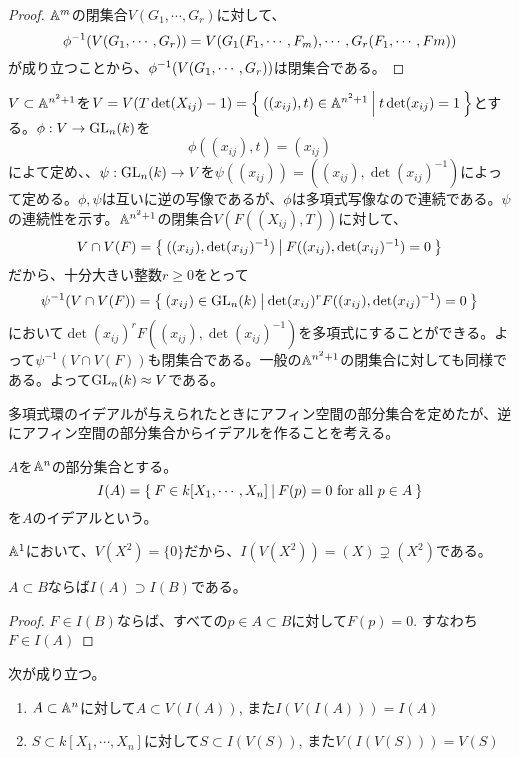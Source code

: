\documentclass{ltjsreport}
\begin{document}
\begin{proof}
  $\mathbb{A}^m$の閉集合$V(G_1,\cdots,G_r)$に対して、
  \[
  \phi^{-1}(V(G_1,\cdots,G_r))=V(G_1(F_1,\cdots,F_m),\cdots,G_r(F_1,\cdots,Fm))  
  \]
  が成り立つことから、$\phi^{-1}(V(G_1,\cdots,G_r))$は閉集合である。
\end{proof}

\begin{eg}\label{affine_gl_n}
  $V\subset\mathbb{A}^{n^2+1}$を$V=V(T\det(X_{ij})-1)=\left\{\:((x_{ij}),t)\in\mathbb{A}^{n^2+1}\:\middle|\:t\det(x_{ij})=1\:\right\}$とする。$\phi:V\rightarrow \text{GL}_n(k)$を
  \[
  \phi((x_{ij}),t)=(x_{ij})  
  \]
  によて定め、、$\psi:\text{GL}_n(k)\rightarrow V$を$\psi((x_{ij}))=((x_{ij}),\det(x_{ij})^{-1})$によって定める。$\phi,\psi$は互いに逆の写像であるが、$\phi$は多項式写像なので連続である。$\psi$の連続性を示す。$\mathbb{A}^{n^2+1}$の閉集合$V(F((X_{ij}),T))$に対して、
  \[
  V\cap V(F)=\left\{\:((x_{ij}),\det(x_{ij})^{-1})\:\middle|\:F((x_{ij}),\det(x_{ij})^{-1})=0\:\right\}  
  \]
  だから、十分大きい整数$r\geq 0$をとって
  \[
  \psi^{-1}(V\cap V(F))=\left\{\:(x_{ij})\in\text{GL}_n(k)\:\middle|\:\det(x_{ij})^rF((x_{ij}),\det(x_{ij})^{-1})=0\:\right\}  
  \]
  において$\det(x_{ij})^rF((x_{ij}),\det(x_{ij})^{-1})$を多項式にすることができる。よって$\psi^{-1}(V\cap V(F))$も閉集合である。一般の$\mathbb{A}^{n^2+1}$の閉集合に対しても同様である。よって$\text{GL}_n(k)\approx V$である。
\end{eg}




多項式環のイデアルが与えられたときにアフィン空間の部分集合を定めたが、逆にアフィン空間の部分集合からイデアルを作ることを考える。

\begin{defin}
  $A$を$\mathbb{A}^n$の部分集合とする。
  \[
  I(A)=\left\{\:F\in k[X_1,\cdots,X_n]\:\middle|\:F(p)=0 \text{ for all }p\in A\:\right\}
  \]
  を$A$のイデアルという。
\end{defin}

\begin{eg}
  $\mathbb{A}^1$において、$V(X^2)=\{0\}$だから、$I(V(X^2))=(X)\supsetneq (X^2)$である。
\end{eg}

\begin{prop}\label{containment2}
  $A\subset B$ならば$I(A)\supset I(B)$である。
\end{prop}

\begin{proof}
  $F\in I(B)$ならば、すべての$p\in A\subset B$に対して$F(p)=0$. すなわち$F\in I(A)$
\end{proof}

\begin{prop}\label{VIrelation}
  次が成り立つ。
  \begin{enumerate}
    \item $A\subset \mathbb{A}^n$に対して$A\subset V(I(A))$, また$I(V(I(A)))=I(A)$
    \item $S\subset k[X_1,\cdots,X_n]$に対して$S\subset I(V(S))$, また$V(I(V(S)))=V(S)$
  \end{enumerate}
\end{prop}
\end{document}
